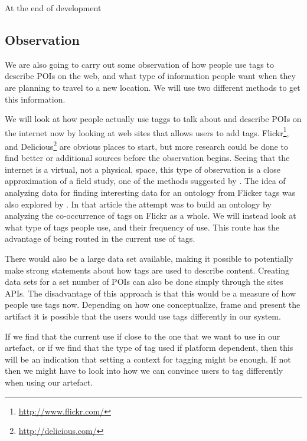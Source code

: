 At the end of development


\subsection{Observation}
We are also going to carry out some observation of how people use tags to describe POIs on the web, and what type of information people want when they are planning to travel to a new location.
We will use two different methods to get this information.

We will look at how people actually use taggs to talk about and describe POIs on the internet now by looking at web sites that allows users to add tags. 
Flickr\footnote{\url{http://www.flickr.com/}}, and Delicious\footnote{\url{http://delicious.com/}} are obvious places to start, 
but more research could be done to find better or additional sources before the observation begins.
Seeing that the internet is a virtual, not a physical, space, this type of observation is a close approximation of a field study, one of the methods suggested by \citet{Chen1990}.
The idea of analyzing data for finding interesting data for an ontology from Flicker tags was also explored by \citet{Schmitz2006}. 
In that article the attempt was to build an ontology by analyzing the co-occurrence of tags on Flickr as a whole. 
We will instead look at what type of tags people use, and their frequency of use.
This route has the advantage of being routed in the current use of tags. 

There would also be a large data set available, making it possible to potentially make strong statements about how tags are used to describe content.
Creating data sets for a set number of POIs can also be done simply through the sites APIs.
The disadvantage of this approach is that this would be a measure of how people use tags now. 
Depending on how one conceptualize, frame and present the artifact it is possible that the users would use tags differently in our system.

If we find that the current use if close to the one that we want to use in our artefact, 
or if we find that the type of tag used if platform dependent, 
then this will be an indication that setting a context for tagging might be enough.
If not then we might have to look into how we can convince users to tag differently when using our artefact.


